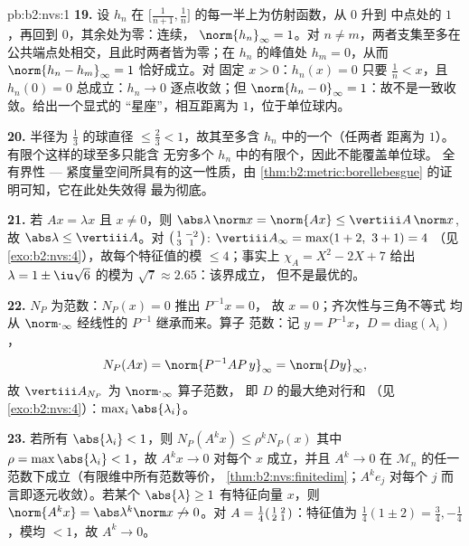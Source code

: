 \begin{solution}{pb:b2:nvs:1}
\textbf{19.} 设 $h_n$ 在
$\bigl[\frac1{n+1}, \frac1n\bigr]$ 的每一半上为仿射函数，从 $0$ 升到
中点处的 $1$，再回到 $0$，其余处为零：连续，
$\norm{h_n}_\infty = 1$。对 $n \neq m$，两者支集至多在
公共端点处相交，且此时两者皆为零；在
$h_n$ 的峰值处 $h_m = 0$，从而 $\norm{h_n - h_m}_\infty = 1$ 恰好成立。对
固定 $x > 0$：$h_n(x) = 0$ 只要 $\frac1n < x$，且
$h_n(0) = 0$ 总成立：$h_n \to 0$ 逐点收敛；但
$\norm{h_n - 0}_\infty = 1$：故不是一致收敛。给出一个显式的
“星座”，相互距离为 $1$，位于单位球内。

\textbf{20.} 半径为 $\frac13$ 的球直径 $\leq
\frac23 < 1$，故其至多含 $h_n$ 中的一个（任两者
距离为 $1$）。有限个这样的球至多只能含
无穷多个 $h_n$ 中的有限个，因此不能覆盖单位球。
全有界性 --- 紧度量空间所具有的这一性质，由
\cref{thm:b2:metric:borellebesgue} 的证明可知，它在此处失效得
最为彻底。

\textbf{21.} 若 $Ax = \lambda x$ 且 $x \neq 0$，则
$\abs\lambda\,\norm x = \norm{Ax} \leq \vertiii A\,\norm x$,
故 $\abs\lambda \leq \vertiii A$。对
$\begin{psmallmatrix}1 & -2\\ 3 & 1\end{psmallmatrix}$:
$\vertiii A_\infty = \max(1 + 2,\ 3 + 1) = 4$
（见\cref{exo:b2:nvs:4}），故每个特征值的模 $\leq
4$；事实上 $\chi_A = X^2 - 2X + 7$ 给出 $\lambda = 1 \pm
\iu\sqrt6$ 的模为 $\sqrt7 \approx 2.65$：该界成立，
但不是最优的。

\textbf{22.} $N_P$ 为范数：$N_P(x) = 0$ 推出 $P^{-1}x = 0$，
故 $x = 0$；齐次性与三角不等式
均从 $\norm\cdot_\infty$ 经线性的 $P^{-1}$ 继承而来。算子
范数：记 $y = P^{-1}x$，$D = \mathrm{diag}(\lambda_i)$，
\[
N_P(Ax) = \norm{P^{-1}AP\,y}_\infty = \norm{Dy}_\infty,
\]
故 $\vertiii A_{N_P}$ 为 $\norm\cdot_\infty$ 算子范数，
即 $D$ 的最大绝对行和
（见\cref{exo:b2:nvs:4}）：$\max_i\abs{\lambda_i}$。

\textbf{23.} 若所有 $\abs{\lambda_i} < 1$，则 $N_P(A^kx) \leq
\rho^kN_P(x)$ 其中 $\rho = \max\abs{\lambda_i} < 1$，故 $A^kx
\to 0$ 对每个 $x$ 成立，并且 $A^k \to 0$ 在
$\mathcal{M}_n$ 的任一范数下成立（有限维中所有范数等价，
\cref{thm:b2:nvs:finitedim}；$A^ke_j$ 对每个
$j$ 而言即逐元收敛）。若某个 $\abs{\lambda} \geq 1$
有特征向量 $x$，则 $\norm{A^kx} = \abs\lambda^k\norm x
\not\to 0$。对 $A = \frac14\begin{psmallmatrix}1 & 2\\ 2 &
1\end{psmallmatrix}$：特征值为 $\frac14(1 \pm 2) =
\frac34, -\frac14$，模均 $< 1$，故 $A^k \to 0$。


\end{solution}
